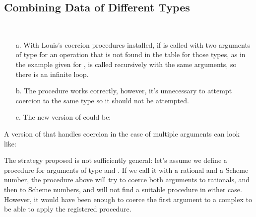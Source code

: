 \subsection{Combining Data of Different Types}

\begin{exe}[2.81]
    \ \vspace{-20pt}
    \begin{itemize}
        \item[a.] With Louis’s coercion procedures installed, if 
             is called with two arguments of type 
             for an operation that is not found in the table for 
            those types, as in the example given for , 
             is called recursively with the same arguments, 
            so there is an infinite loop.
        \item[b.]The   procedure works correctly, however, 
            it’s unnecessary to attempt coercion to the same type so it should 
            not be attempted.
        \item[c.] The new version of  could be:
    \end{itemize}
\end{exe}

\begin{exe}[2.82]
    A version of  that handles coercion in the case of 
    multiple arguments can look like:

    The strategy proposed is not sufficiently general: let’s assume we define 
    a procedure  for arguments of type  and 
    . If we call it with a rational and a Scheme number, the 
    procedure above will try to coerce both arguments to rationals, and then to 
    Scheme numbers, and will not find a suitable procedure in either case. 
    However, it would have been enough to coerce the first argument to a complex 
    to be able to apply the registered procedure.
\end{exe}
